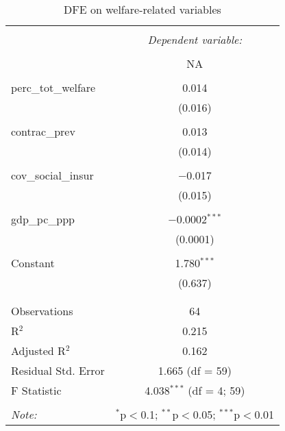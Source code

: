 
\begin{table}[!htbp] \centering 
  \caption{DFE on welfare-related variables} 
  \label{} 
\begin{tabular}{@{\extracolsep{5pt}}lc} 
\\[-1.8ex]\hline 
\hline \\[-1.8ex] 
 & \multicolumn{1}{c}{\textit{Dependent variable:}} \\ 
\cline{2-2} 
\\[-1.8ex] & NA \\ 
\hline \\[-1.8ex] 
 perc\_tot\_welfare & 0.014 \\ 
  & (0.016) \\ 
  & \\ 
 contrac\_prev & 0.013 \\ 
  & (0.014) \\ 
  & \\ 
 cov\_social\_insur & $-$0.017 \\ 
  & (0.015) \\ 
  & \\ 
 gdp\_pc\_ppp & $-$0.0002$^{***}$ \\ 
  & (0.0001) \\ 
  & \\ 
 Constant & 1.780$^{***}$ \\ 
  & (0.637) \\ 
  & \\ 
\hline \\[-1.8ex] 
Observations & 64 \\ 
R$^{2}$ & 0.215 \\ 
Adjusted R$^{2}$ & 0.162 \\ 
Residual Std. Error & 1.665 (df = 59) \\ 
F Statistic & 4.038$^{***}$ (df = 4; 59) \\ 
\hline 
\hline \\[-1.8ex] 
\textit{Note:}  & \multicolumn{1}{r}{$^{*}$p$<$0.1; $^{**}$p$<$0.05; $^{***}$p$<$0.01} \\ 
\end{tabular} 
\end{table} 
